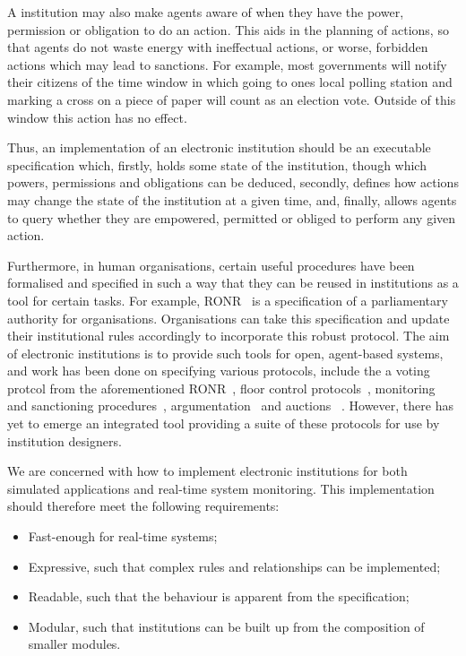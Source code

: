 
A institution may also make agents aware of when they have the power,
permission or obligation to do an action. This aids in the planning of actions,
so that agents do not waste energy with ineffectual actions, or worse, forbidden
actions which may lead to sanctions. For example, most governments will notify
their citizens of the time window in which going to ones local polling station
and marking a cross on a piece of paper will count as an election vote. Outside 
of this window this action has no effect.

Thus, an implementation of an electronic institution should be an executable
specification which, firstly, holds some state of the institution, though which
powers, permissions and obligations can be deduced, secondly, defines how
actions may change the state of the institution at a given time, and, finally,
allows agents to query whether they are empowered, permitted or obliged to perform
any given action.

Furthermore, in human organisations, certain useful procedures have been
formalised and specified in such a way that they can be reused in institutions
as a tool for certain tasks. For example, \ac{RONR}~\citep{Robert2011} is a
specification of a parliamentary authority for organisations. Organisations
can take this specification and update their institutional rules accordingly
to incorporate this robust protocol. The aim of electronic institutions is to
provide such tools for open, agent-based systems, and work has been done on
specifying various protocols, include the a voting protcol from the aforementioned
\ac{RONR}~\citep{Pitt2005a}, floor control
protocols~\citep{Artikis2004,Artikis2009b}, monitoring and sanctioning
procedures~\citep{Pitt2012c}, argumentation~\citep{Artikis2003} and auctions~
\citep{Rodriguez1997}. However, there has yet to emerge an integrated tool
providing a suite of these protocols for use by institution designers.

We are concerned with how to implement electronic institutions for both
simulated applications and real-time system monitoring. This implementation
should therefore meet the following requirements:
\begin{itemize}
\item Fast-enough for real-time systems;
\item Expressive, such that complex rules and relationships can be implemented;
\item Readable, such that the behaviour is apparent from the specification;
\item Modular, such that institutions can be built up from the composition of smaller modules.
\end{itemize}


